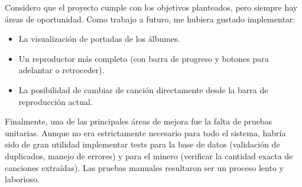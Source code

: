 \documentclass{article}
\begin{document}
Considero que el proyecto cumple con los objetivos planteados, pero siempre hay áreas de oportunidad. Como trabajo a futuro, me hubiera gustado implementar:
\begin{itemize}
    \item La visualización de portadas de los álbumes.
    \item Un reproductor más completo (con barra de progreso y botones para adelantar o retroceder).
    \item La posibilidad de cambiar de canción directamente desde la barra de reproducción actual.
\end{itemize}

Finalmente, una de las principales áreas de mejora fue la falta de pruebas unitarias. Aunque no era estrictamente necesario para todo el sistema, habría sido de gran utilidad implementar tests para la base de datos (validación de duplicados, manejo de errores) y para el minero (verificar la cantidad exacta de canciones extraídas). Las pruebas manuales resultaron ser un proceso lento y laborioso.
    
    

\end{document}
